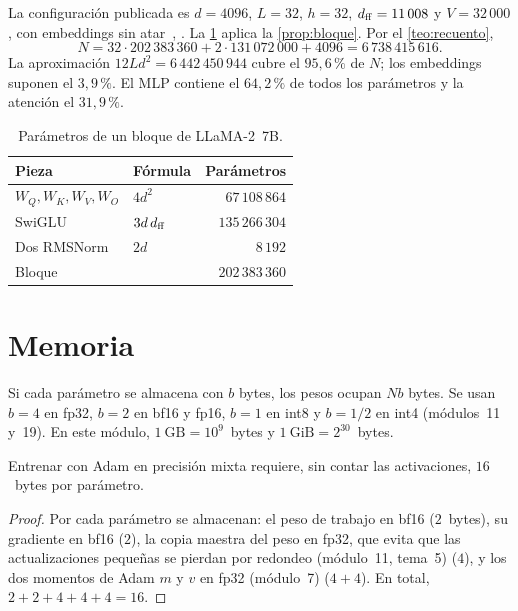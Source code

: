\begin{ejemplo}[LLaMA-2~7B]\label{ej:llama7b}
La configuración publicada es $d=4096$, $L=32$, $h=32$, $d_{\mathrm{ff}}=11\,008$ y $V=32\,000$, con embeddings sin atar~\cite[tabla~2]{llama}, \cite{llamacode}. La \cref{tab:llama7b} aplica la \cref{prop:bloque}. Por el \cref{teo:recuento},
\[
N=32\cdot 202\,383\,360+2\cdot 131\,072\,000+4096=6\,738\,415\,616.
\]
La aproximación $12Ld^{2}=6\,442\,450\,944$ cubre el $95{,}6\,\%$ de $N$; los embeddings suponen el $3{,}9\,\%$. El MLP contiene el $64{,}2\,\%$ de todos los parámetros y la atención el $31{,}9\,\%$.
\end{ejemplo}

\begin{table}[ht]
\centering\small
\caption{Parámetros de un bloque de LLaMA-2~7B.}\label{tab:llama7b}
\begin{tabular}{@{}llr@{}}
\toprule
Pieza & Fórmula & Parámetros \\
\midrule
$W_Q,W_K,W_V,W_O$ & $4d^{2}$ & $67\,108\,864$ \\
SwiGLU & $3d\,d_{\mathrm{ff}}$ & $135\,266\,304$ \\
Dos RMSNorm & $2d$ & $8\,192$ \\
\midrule
Bloque & & $202\,383\,360$ \\
\bottomrule
\end{tabular}
\end{table}

\section{Memoria}

\begin{definicion}
Si cada parámetro se almacena con $b$ bytes, los pesos ocupan $Nb$ bytes. Se usan $b=4$ en fp32, $b=2$ en bf16 y fp16, $b=1$ en int8 y $b=1/2$ en int4 (módulos~11 y~19). En este módulo, $1~\mathrm{GB}=10^{9}$~bytes y $1~\mathrm{GiB}=2^{30}$~bytes.
\end{definicion}

\begin{proposicion}\label{prop:16bytes}
Entrenar con Adam en precisión mixta requiere, sin contar las activaciones, $16$~bytes por parámetro.
\end{proposicion}

\begin{proof}
Por cada parámetro se almacenan: el peso de trabajo en bf16 ($2$~bytes), su gradiente en bf16 ($2$), la copia maestra del peso en fp32, que evita que las actualizaciones pequeñas se pierdan por redondeo (módulo~11, tema~5) ($4$), y los dos momentos de Adam $m$ y $v$ en fp32 (módulo~7) ($4+4$). En total, $2+2+4+4+4=16$.
\end{proof}


